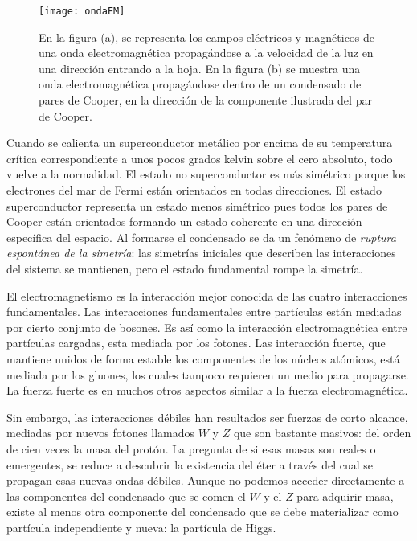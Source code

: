 \begin{figure}
  \centering
  \texttt{[image: ondaEM]}
  \caption{En la figura (a), se representa los campos eléctricos y magnéticos de una onda electromagnética propagándose a la velocidad de la luz en una dirección entrando a la hoja. En  la figura (b) se muestra una onda electromagnética propagándose dentro de un condensado de pares de Cooper, en la dirección de la componente ilustrada del par de Cooper.}
  \label{fig:2}
\end{figure}


Cuando se calienta un superconductor metálico por encima de su temperatura crítica correspondiente a unos pocos grados kelvin sobre el cero absoluto, todo vuelve a la normalidad. El estado no superconductor es más simétrico porque los electrones del mar de Fermi están orientados en todas direcciones. El estado superconductor representa un estado menos simétrico pues todos los pares de Cooper están orientados formando un estado coherente en una dirección específica del espacio. Al formarse el condensado se da un fenómeno de \emph{ruptura espontánea de la simetría}: las simetrías iniciales que describen las interacciones del sistema se mantienen, pero el estado fundamental rompe la simetría.  

El electromagnetismo es la interacción mejor conocida de las cuatro interacciones fundamentales. Las interacciones fundamentales  entre partículas están mediadas por cierto conjunto de bosones.  Es así como la interacción electromagnética entre partículas cargadas, esta mediada por los fotones. Las interacción fuerte, que mantiene unidos de forma estable los componentes de los núcleos atómicos, está mediada por los gluones, los cuales tampoco requieren un medio para propagarse. La fuerza fuerte es en muchos otros aspectos similar a la fuerza electromagnética. 

Sin embargo, las interacciones débiles han resultados ser fuerzas de corto alcance, mediadas por nuevos fotones llamados $W$ y $Z$ que son bastante masivos: del orden de cien veces la masa del protón. La pregunta de si esas masas son reales o emergentes, se reduce a descubrir la existencia del éter a través del cual se propagan esas nuevas ondas débiles. Aunque no podemos acceder directamente a las componentes del condensado que se comen el $W$ y el $Z$ para adquirir masa, existe al menos otra componente del condensado que se debe materializar como partícula independiente y nueva: la partícula de Higgs. 

